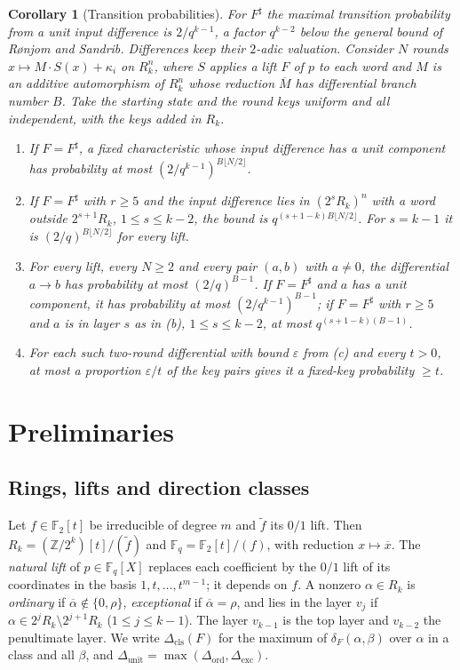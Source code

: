 \documentclass[11pt]{article}
\newtheorem{maincorollary}[maintheorem]{Corollary}
\theoremstyle{definition}
\theoremstyle{remark}
\newcommand{\F}{\mathbb{F}}
\newcommand{\Z}{\mathbb{Z}}
\newcommand{\ol}[1]{\overline{#1}}
\newcommand{\Dexc}{\Delta_{\mathrm{exc}}}
\newcommand{\Dunit}{\Delta_{\mathrm{unit}}}
\begin{document}
\begin{maincorollary}[Transition probabilities]\label{cor:crypto}
For $F^\sharp$ the maximal transition probability from a unit input difference is $2/q^{k-1}$, a factor
$q^{k-2}$ below the general bound of Rønjom and Sandrib. Differences keep their $2$-adic valuation.
Consider $N$ rounds $x\mapsto M\cdot S(x)+\kappa_i$ on $R_k^n$, where $S$ applies a lift $F$ of $p$ to each word and
$M$ is an additive automorphism of $R_k^n$ whose reduction $\ol M$ has differential branch number $B$. Take the
starting state and the round keys uniform and all independent, with the keys added in $R_k$.
\begin{enumerate}[label=(\alph*)]
\item If $F=F^\sharp$, a fixed characteristic whose input difference has a unit component has probability at most
$(2/q^{k-1})^{B\lfloor N/2\rfloor}$.
\item If $F=F^\sharp$ with $r\ge5$ and the input difference lies in $(2^sR_k)^n$ with a word outside $2^{s+1}R_k$,
$1\le s\le k-2$, the bound is $q^{(s+1-k)B\lfloor N/2\rfloor}$. For $s=k-1$ it is $(2/q)^{B\lfloor N/2\rfloor}$ for
every lift.
\item For every lift, every $N\ge2$ and every pair $(a,b)$ with $a\ne0$, the differential $a\to b$ has probability at
most $(2/q)^{B-1}$. If $F=F^\sharp$ and $a$ has a unit component, it has probability at most $(2/q^{k-1})^{B-1}$; if
$F=F^\sharp$ with $r\ge5$ and $a$ is in layer $s$ as in (b), $1\le s\le k-2$, at most $q^{(s+1-k)(B-1)}$.
\item For each such two-round differential with bound $\varepsilon$ from (c) and every $t>0$, at most a proportion
$\varepsilon/t$ of the key pairs gives it a fixed-key probability $\ge t$.
\end{enumerate}
\end{maincorollary}

\section{Preliminaries}\label{sec:prelim}

\subsection{Rings, lifts and direction classes}
Let $f\in\F_2[t]$ be irreducible of degree $m$ and $\tilde f$ its $0/1$ lift. Then
$R_k=(\Z/2^k)[t]/(\tilde f)$ and $\F_q=\F_2[t]/(f)$, with reduction $x\mapsto\ol x$. The \emph{natural lift} of
$p\in\F_q[X]$ replaces each coefficient by the $0/1$ lift of its coordinates in the basis $1,t,\dots,t^{m-1}$; it
depends on $f$. A nonzero
$\alpha\in R_k$ is \emph{ordinary} if $\ol\alpha\notin\{0,\rho\}$, \emph{exceptional} if $\ol\alpha=\rho$, and
lies in the layer $v_j$ if $\alpha\in2^jR_k\setminus2^{j+1}R_k$ ($1\le j\le k-1$). The layer $v_{k-1}$ is the
top layer and $v_{k-2}$ the penultimate layer. We write $\Delta_{\mathrm{cls}}(F)$ for the maximum of
$\delta_F(\alpha,\beta)$ over $\alpha$ in a class and all $\beta$, and $\Dunit=\max(\Delta_{\mathrm{ord}},\Dexc)$.
\end{document}
